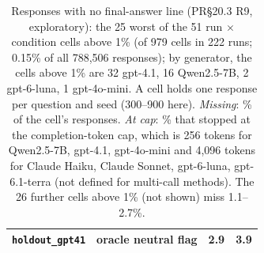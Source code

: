 \begin{table}[t]
\begin{tabular}{@{}llrr@{}}
\texttt{holdout\_gpt41} & oracle neutral flag & 2.9 & 3.9 \\
\bottomrule
\end{tabular}
\caption{Responses with no final-answer line (PR\S20.3 R9, exploratory): the 25 worst of the
51 run $\times$ condition cells above 1\% (of 979 cells in
222 runs; 0.15\% of all 788,506 responses); by generator, the
cells above 1\% are 32 gpt-4.1, 16 Qwen2.5-7B, 2 gpt-6-luna, 1 gpt-4o-mini. A cell holds one response per question and seed (300--900 here).
\emph{Missing}: \% of the cell's responses. \emph{At cap}: \% that stopped at the completion-token cap, which is
256 tokens for Qwen2.5-7B, gpt-4.1, gpt-4o-mini and 4,096 tokens for Claude Haiku, Claude Sonnet, gpt-6-luna, gpt-6.1-terra (not defined for multi-call methods). The 26 further cells above 1\% (not shown) miss 1.1--2.7\%.}
\label{tab:missing}
\end{table}
